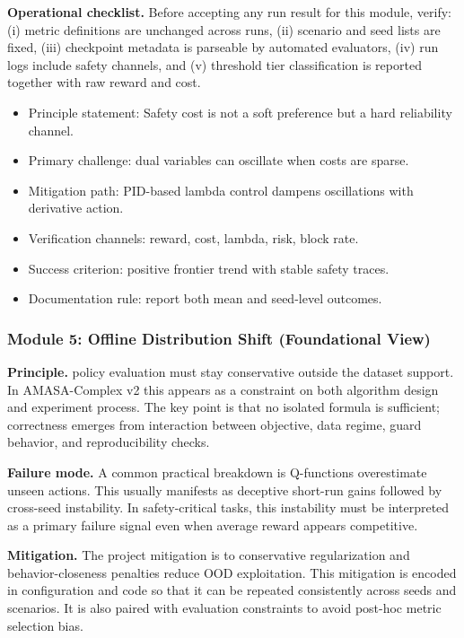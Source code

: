 \documentclass[conference]{IEEEtran}
\begin{document}
\textbf{Operational checklist.} Before accepting any run result for this module, verify: (i) metric definitions are unchanged across runs, (ii) scenario and seed lists are fixed, (iii) checkpoint metadata is parseable by automated evaluators, (iv) run logs include safety channels, and (v) threshold tier classification is reported together with raw reward and cost.

\begin{itemize}[leftmargin=*]
  \item Principle statement: Safety cost is not a soft preference but a hard reliability channel.
  \item Primary challenge: dual variables can oscillate when costs are sparse.
  \item Mitigation path: PID-based lambda control dampens oscillations with derivative action.
  \item Verification channels: reward, cost, lambda, risk, block rate.
  \item Success criterion: positive frontier trend with stable safety traces.
  \item Documentation rule: report both mean and seed-level outcomes.
\end{itemize}


\subsubsection{Module 5: Offline Distribution Shift (Foundational View)}
\textbf{Principle.} policy evaluation must stay conservative outside the dataset support. In AMASA-Complex v2 this appears as a constraint on both algorithm design and experiment process. The key point is that no isolated formula is sufficient; correctness emerges from interaction between objective, data regime, guard behavior, and reproducibility checks.

\textbf{Failure mode.} A common practical breakdown is Q-functions overestimate unseen actions. This usually manifests as deceptive short-run gains followed by cross-seed instability. In safety-critical tasks, this instability must be interpreted as a primary failure signal even when average reward appears competitive.

\textbf{Mitigation.} The project mitigation is to conservative regularization and behavior-closeness penalties reduce OOD exploitation. This mitigation is encoded in configuration and code so that it can be repeated consistently across seeds and scenarios. It is also paired with evaluation constraints to avoid post-hoc metric selection bias.
\end{document}
